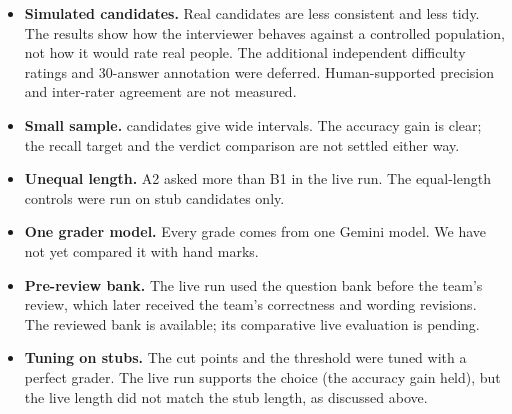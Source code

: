 \documentclass[11pt,a4paper]{article}
\begin{document}
\begin{itemize}
  \item \textbf{Simulated candidates.} Real candidates are less consistent and less tidy. The
  results show how the interviewer behaves against a controlled population, not how it would rate
  real people. The additional independent difficulty ratings and 30-answer annotation were
  deferred. Human-supported precision and inter-rater agreement are not measured.
  \item \textbf{Small sample.} \nCandidates{} candidates give wide intervals. The accuracy gain is
  clear; the recall target and the verdict comparison are not settled either way.
  \item \textbf{Unequal length.} A2 asked more than B1 in the live run. The equal-length controls
  were run on stub candidates only.
  \item \textbf{One grader model.} Every grade comes from one Gemini model. We have not yet compared
  it with hand marks.
  \item \textbf{Pre-review bank.} The live run used the question bank before the team's review,
  which later received the team's correctness and wording revisions. The reviewed bank is available;
  its comparative live evaluation is pending.
  \item \textbf{Tuning on stubs.} The cut points and the threshold were tuned with a perfect grader.
  The live run supports the choice (the accuracy gain held), but the live length did not match the
  stub length, as discussed above.
\end{itemize}


\end{document}
